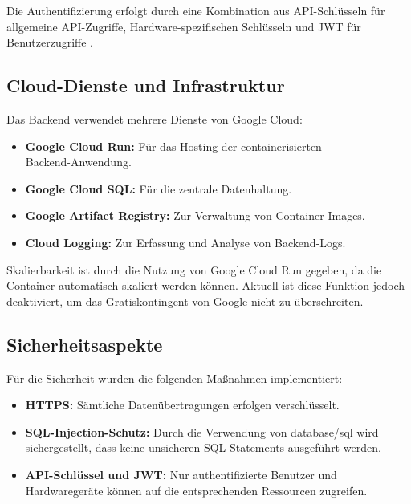 Die Authentifizierung erfolgt durch eine Kombination aus API-Schlüsseln für allgemeine API-Zugriffe, 
Hardware-spezifischen Schlüsseln und JWT für Benutzerzugriffe .

\subsection{Cloud-Dienste und Infrastruktur}

Das Backend verwendet mehrere Dienste von Google Cloud:

\begin{itemize}
	\item \textbf{Google Cloud Run:} Für das Hosting der containerisierten\\
	Backend-Anwendung\cite{googlecloudrun}.
	\item \textbf{Google Cloud SQL:} Für die zentrale Datenhaltung\cite{googlecloudsql}.
	\item \textbf{Google Artifact Registry:} Zur Verwaltung von Container-Images\cite{googleartifactregistry}.
	\item \textbf{Cloud Logging:} Zur Erfassung und Analyse von Backend-Logs\cite{googlecloudlogging}.
\end{itemize}

Skalierbarkeit ist durch die Nutzung von Google Cloud Run gegeben, da die Container automatisch 
skaliert werden können. Aktuell ist diese Funktion jedoch deaktiviert, um das Gratiskontingent von 
Google nicht zu überschreiten.


\subsection{Sicherheitsaspekte}

Für die Sicherheit wurden die folgenden Maßnahmen implementiert:
\begin{itemize}
	\item \textbf{HTTPS:} Sämtliche Datenübertragungen erfolgen verschlüsselt.
	\item \textbf{SQL-Injection-Schutz:} Durch die Verwendung von database/sql wird sichergestellt, 
	dass keine unsicheren SQL-Statements ausgeführt werden.
	\item \textbf{API-Schlüssel und JWT:} Nur authentifizierte Benutzer und Hardwaregeräte können auf 
	die entsprechenden Ressourcen zugreifen.
\end{itemize}



